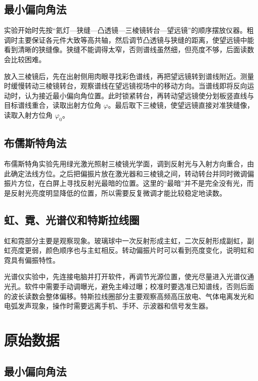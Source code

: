 \documentclass[UTF8,12pt,a4paper]{ctexart}
\begin{document}
\subsection{最小偏向角法}

实验开始时先按“氦灯—狭缝—凸透镜—三棱镜转台—望远镜”的顺序摆放仪器。粗调时主要保证各元件大致等高共轴，然后调节凸透镜与狭缝的距离，使望远镜中能看到清晰的狭缝像。狭缝不能调得太窄，否则谱线虽然细，但亮度不够，后面读数会比较困难。

放入三棱镜后，先在出射侧用肉眼寻找彩色谱线，再把望远镜转到谱线附近。测量时缓慢转动三棱镜转台，观察谱线在望远镜视场中的移动方向。当谱线即将反向运动时，认为接近最小偏向角位置。此时锁紧转台，再转动望远镜使分划板竖直线与目标谱线重合，读取出射方位角 \(\varphi\)。最后取下三棱镜，使望远镜直接对准狭缝像，读取入射方位角 \(\varphi_0\)。

\subsection{布儒斯特角法}

布儒斯特角实验先用绿光激光照射三棱镜光学面，调到反射光与入射方向重合，由此确定法线方位。之后把偏振片放在激光器和三棱镜之间，转动转台并同时微调偏振片方位，在白屏上寻找反射光最暗的位置。这里的“最暗”并不是完全没有光，而是反射光亮度明显降低的位置，所以需要反复微调才能比较稳定地读数。

\subsection{虹、霓、光谱仪和特斯拉线圈}

虹和霓部分主要是观察现象。玻璃球中一次反射形成主虹，二次反射形成副虹，副虹亮度更弱，颜色顺序也与主虹相反。转动偏振片时可以看到亮度变化，说明虹和霓具有偏振特性。

光谱仪实验中，先连接电脑并打开软件，再调节光源位置，使光尽量进入光谱仪通光孔。软件中需要手动调曝光，避免主峰过曝；校准时要选准已知谱线，否则后面的波长读数会整体偏移。特斯拉线圈部分主要观察高频高压放电、气体电离发光和电弧发声现象，操作时需要远离手机、手环、示波器和信号发生器。

\section{原始数据}

\subsection{最小偏向角法}
\end{document}

